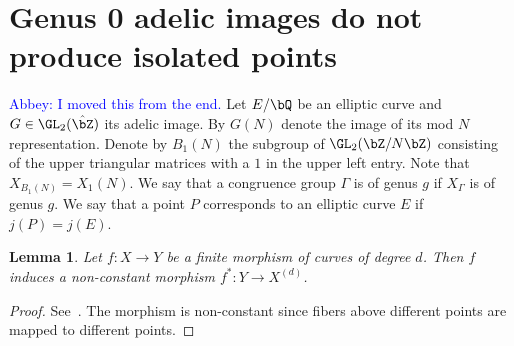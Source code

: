 \documentclass[11pt,reqno]{amsart}
\theoremstyle{plain}
\newtheorem{theorem}{Theorem}%
\newtheorem{lemma}[theorem]{Lemma}
\theoremstyle{definition}
\newcommand{\Q}{\bQ}
\newcommand{\Z}{\bZ}
\newcommand{\abbey}[1]{\textcolor{blue}{Abbey: #1}}
\newcommand{\timo}[1]{\textcolor{red}{Timo: #1}}
\begin{document}


\section{Genus 0 adelic images do not produce isolated points}

\abbey{I moved this from the end.}
\label{sec:genus0}
Let $E/\Q$ be an elliptic curve and $G\in \GL_2(\hat \Z)$ its adelic image. By $G(N)$ denote the image of its mod $N$ representation. Denote by $B_1(N)$ the subgroup of $\GL_2(\Z/N\Z)$ consisting of the upper triangular matrices with a $1$ in the upper left entry. Note that $X_{B_1(N)}=X_1(N)$. We say that a congruence group $\Gamma$ is of genus $g$ if $X_\Gamma$ is of genus $g$. We say that a point $P$ corresponds to an elliptic curve $E$ if $j(P)=j(E)$.

\begin{lemma} \label{lem:map to Symd}
Let $f\colon X \to Y$ be a finite morphism of curves of degree $d$. Then $f$ induces a non-constant morphism $f^*\colon Y \to X^{(d)}$.
\end{lemma}
\begin{proof}
    See~\cite[Theorem~3.13]{MilneJV}. The morphism is non-constant since fibers above different points are mapped to different points.
\end{proof}
\end{document}
